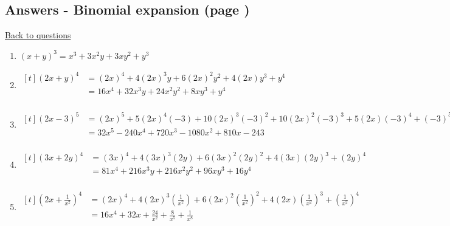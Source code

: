 \documentclass[../main.tex]{subfiles}
\begin{document}
\hypertarget{binomialexpansionanswers}{\subsection*{Answers - Binomial expansion (page \pageref{Binomial Expansion})}}

\label{Binomial expansion answers}
\hyperlink{binomialexpansionlink}{Back to questions}
\begin{enumerate}
    \item \( (x+y)^3 = x^3 + 3x^2 y + 3xy^2 +y^3 \)
    \item 
    $
    \!
    \begin{aligned}[t]
     (2x+y)^4 
        &= (2x)^4 + 4(2x)^3y + 6(2x)^2y^2 + 4(2x)y^3 + y^4 \\
        &= 16x^4 + 32x^3y + 24x^2y^2 + 8xy^3 + y^4 \\
    \end{aligned}
    $ 
    \item 
    $
    \!
    \begin{aligned}[t]
     (2x-3)^5 
        &= (2x)^5 + 5(2x)^4(-3) + 10(2x)^3(-3)^2 + 10(2x)^2(-3)^3 + 5(2x)(-3)^4 + (-3)^5 \\
        &= 32x^5 -240x^4 +720x^3 - 1080x^2 + 810x - 243 \\
    \end{aligned}
    $

    \item 
    $
    \!
    \begin{aligned}[t]
     (3x+2y)^4 
        &= (3x)^4 + 4(3x)^3(2y) + 6(3x)^2(2y)^2 + 4(3x)(2y)^3 + (2y)^4 \\
        &= 81x^4 +216x^3y +216x^2y^2 + 96xy^3 + 16y^4 \\
    \end{aligned}
    $

    \item 
    $
    \!
    \begin{aligned}[t]
     (2x + \frac{1}{x^2} )^4 
        &= (2x)^4 + 4(2x)^3(\frac{1}{x^2}) + 6(2x)^2(\frac{1}{x^2})^2 + 4(2x)(\frac{1}{x^2})^3 + (\frac{1}{x^2})^4 \\
        &= 16x^4 + 32x + \frac{24}{x^2} + \frac{8}{x^5} + \frac{1}{x^8}\\
    \end{aligned}
    $
    

\end{enumerate}
\end{document}
